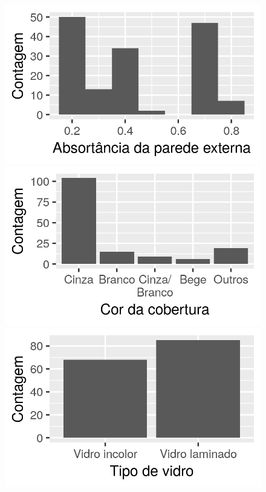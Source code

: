 \documentclass[brazil,hardcopy,openany,a4paper]{ufscthesis}
\begin{document}
	\begin{figure}
		\label{fig:db_hist}
		\centering	
		\begin{minipage}{.5\textwidth}
			\centering
			\includegraphics[width=\linewidth]{img/hist_absortancia.png}
		\end{minipage}%
		\begin{minipage}{.5\textwidth}
			\centering
			\includegraphics[width=\linewidth]{img/hist_cor_cobertura.png}
		\end{minipage}
		\centering	
		\begin{minipage}{.5\textwidth}
			\centering
			\includegraphics[width=\linewidth]{img/hist_tipo_vidro.png}

\end{minipage}
\end{figure}
\end{document}
